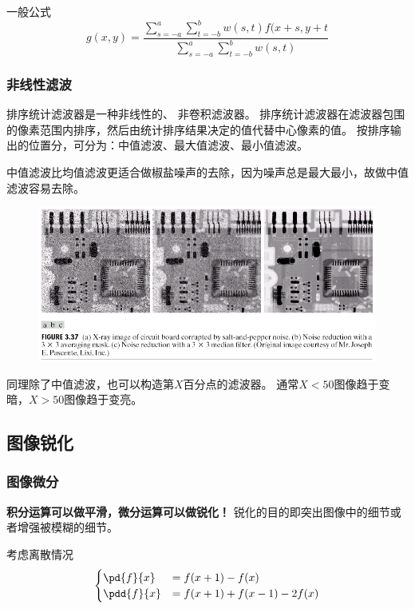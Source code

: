 一般公式
\[g(x,y)=\frac{\sum_{s=-a}^a\sum_{t=-b}^b w(s,t)f(x+s,y+t}{\sum_{s=-a}^a\sum_{t=-b}^b w(s,t)}\]

\subsubsection{非线性滤波}
排序统计滤波器是一种非线性的、 非卷积滤波器。
排序统计滤波器在滤波器包围的像素范围内排序，然后由统计排序结果决定的值代替中心像素的值。
按排序输出的位置分，可分为：中值滤波、最大值滤波、最小值滤波。

中值滤波比均值滤波更适合做椒盐噪声的去除，因为噪声总是最大最小，故做中值滤波容易去除。
\begin{figure}[H]
\centering
\includegraphics[width=0.8\linewidth]{fig/salt-and-pepper-noise.png}
\end{figure}

同理除了中值滤波，也可以构造第$X$百分点的滤波器。
通常$X<50$图像趋于变暗，$X>50$图像趋于变亮。


\subsection{图像锐化}
\subsubsection{图像微分}
\textbf{积分运算可以做平滑，微分运算可以做锐化！}
锐化的目的即突出图像中的细节或者增强被模糊的细节。

考虑离散情况
\[\begin{cases}
\pd{f}{x}&=f(x+1)-f(x)\\
\pdd{f}{x}&=f(x+1)+f(x-1)-2f(x)
\end{cases}\]

